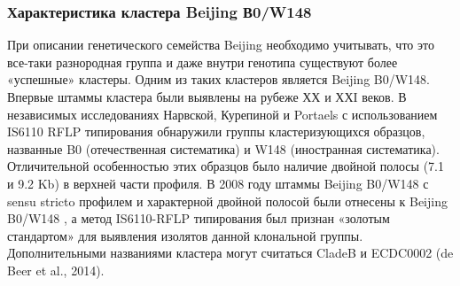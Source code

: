 \subsubsection{Характеристика кластера Beijing В0/W148}
При описании генетического семейства Beijing необходимо учитывать, что это все-таки разнородная группа и даже внутри генотипа существуют более  «успешные» кластеры. Одним из таких кластеров является Beijing B0/W148. Впервые штаммы кластера были выявлены на рубеже ХХ и ХХI веков. В независимых исследованиях Нарвской, Курепиной и Portaels с использованием IS6110 RFLP типирования обнаружили группы кластеризующихся образцов, названные B0 (отечественная систематика) и W148 (иностранная систематика). Отличительной особенностью этих образцов было наличие двойной полосы (7.1 и 9.2 Kb) в верхней части профиля. В 2008 году штаммы Beijing B0/W148 с sensu stricto профилем и характерной двойной полосой были отнесены к Beijing B0/W148 \cite{mokrousov2008molecular}, а метод IS6110-RFLP типирования был признан «золотым стандартом» для выявления изолятов данной клональной группы. Дополнительными названиями кластера могут считаться CladeB \cite{casali2014evolution} и ECDC0002 (de Beer et al., 2014).

